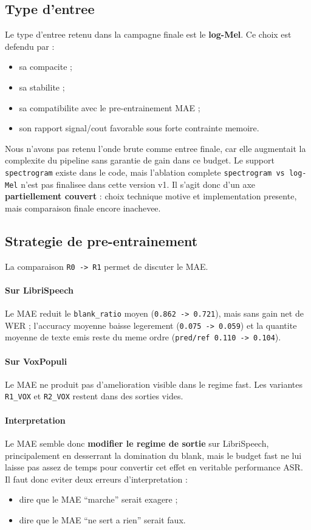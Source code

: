 \documentclass[11pt,a4paper]{article}
\begin{document}
\subsection{Type d'entree}
Le type d'entree retenu dans la campagne finale est le \textbf{log-Mel}. Ce choix est defendu par :
\begin{itemize}[leftmargin=1.2cm]
\item sa compacite ;
\item sa stabilite ;
\item sa compatibilite avec le pre-entrainement MAE ;
\item son rapport signal/cout favorable sous forte contrainte memoire.
\end{itemize}

Nous n'avons pas retenu l'onde brute comme entree finale, car elle augmentait la complexite du pipeline sans garantie de gain dans ce budget. Le support \texttt{spectrogram} existe dans le code, mais l'ablation complete \texttt{spectrogram vs log-Mel} n'est pas finalisee dans cette version v1. Il s'agit donc d'un axe \textbf{partiellement couvert} : choix technique motive et implementation presente, mais comparaison finale encore inachevee.

\subsection{Strategie de pre-entrainement}
La comparaison \texttt{R0 -> R1} permet de discuter le MAE.

\paragraph{Sur LibriSpeech}
Le MAE reduit le \texttt{blank\_ratio} moyen (\texttt{0.862 -> 0.721}), mais sans gain net de WER ; l'accuracy moyenne baisse legerement (\texttt{0.075 -> 0.059}) et la quantite moyenne de texte emis reste du meme ordre (\texttt{pred/ref 0.110 -> 0.104}).

\paragraph{Sur VoxPopuli}
Le MAE ne produit pas d'amelioration visible dans le regime fast. Les variantes \texttt{R1\_VOX} et \texttt{R2\_VOX} restent dans des sorties vides.

\paragraph{Interpretation}
Le MAE semble donc \textbf{modifier le regime de sortie} sur LibriSpeech, principalement en desserrant la domination du blank, mais le budget fast ne lui laisse pas assez de temps pour convertir cet effet en veritable performance ASR. Il faut donc eviter deux erreurs d'interpretation :
\begin{itemize}[leftmargin=1.2cm]
\item dire que le MAE ``marche'' serait exagere ;
\item dire que le MAE ``ne sert a rien'' serait faux.
\end{itemize}
\end{document}
